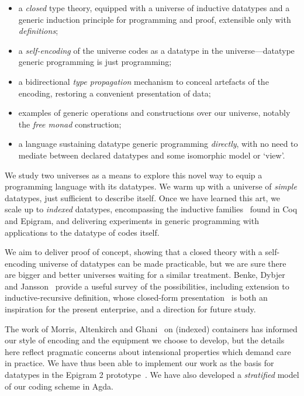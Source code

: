 \documentclass[preprint
              , authoryear
              ]{sigplanconf}
\begin{document}
\begin{itemize}
\item a \emph{closed} type theory, equipped with a universe of
  inductive datatypes and a generic induction principle for programming
  and proof, extensible only with \emph{definitions};
\item a \emph{self-encoding} of the universe codes as a datatype in the
  universe---datatype generic programming is just programming;
\item a bidirectional \emph{type propagation} mechanism to conceal
  artefacts of the encoding, restoring
  a convenient presentation of data;
\item examples of generic operations and constructions over our universe,
  notably the \emph{free monad} construction;
\item a language sustaining datatype generic programming \emph{directly},
  with no need to mediate between declared datatypes and some isomorphic
  model or `view'.
\end{itemize}

We study two universes as a means to explore this novel way to equip a
programming language with its datatypes. We warm up with a universe of
\emph{simple} datatypes, just sufficient to describe itself. Once we
have learned this art, we scale up to \emph{indexed} datatypes,
encompassing the inductive families~\cite{dybjer:families,luo:utt}
found in Coq and Epigram, and delivering experiments in generic
programming with applications to the datatype of codes itself.

We aim to deliver proof of concept, showing that a closed theory with
a self-encoding universe of datatypes can be made practicable, but we
are sure there are bigger and better universes waiting for a similar
treatment. Benke, Dybjer and
Jansson~\cite{benke:universe-generic-prog} provide a useful survey of
the possibilities, including extension to inductive-recursive
definition, whose closed-form presentation~\cite{dybjer:axiom-ir,
  dybjer:ir-initial-algebra} is both an inspiration for the present
enterprise, and a direction for future study.

The work of Morris, Altenkirch and
Ghani~\cite{morris:PhD,morris:spf,alti:lics09} on
(indexed) containers has informed our style of encoding and the
equipment we choose to develop, but the details here reflect pragmatic
concerns about intensional properties which demand care in
practice. We have thus been able to implement our work as the basis
for datatypes in the Epigram 2 prototype~\cite{pigs:epigram}. We
have also developed a \emph{stratified} model of our coding scheme
in Agda.
\end{document}
